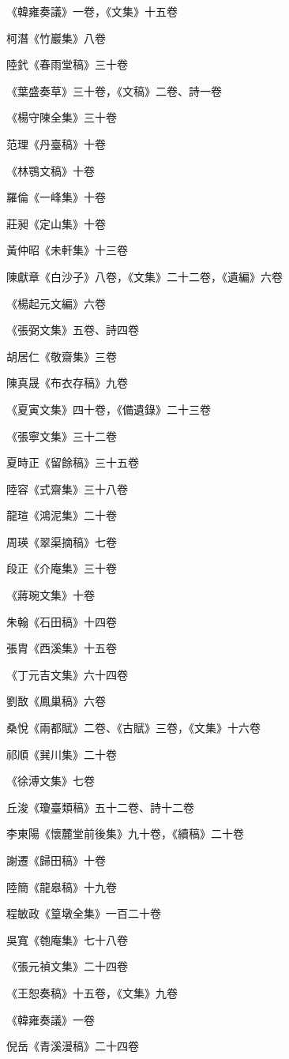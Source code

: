 《韓雍奏議》一卷，《文集》十五卷

柯潛《竹巖集》八卷

陸釴《春雨堂稿》三十卷

《葉盛奏草》三十卷，《文稿》二卷、詩一卷

《楊守陳全集》三十卷

范理《丹臺稿》十卷

《林鶚文稿》十卷

羅倫《一峰集》十卷

莊昶《定山集》十卷

黃仲昭《未軒集》十三卷

陳獻章《白沙子》八卷，《文集》二十二卷，《遺編》六卷

《楊起元文編》六卷

《張弼文集》五卷、詩四卷

胡居仁《敬齋集》三卷

陳真晟《布衣存稿》九卷

《夏寅文集》四十卷，《備遺錄》二十三卷

《張寧文集》三十二卷

夏時正《留餘稿》三十五卷

陸容《式齋集》三十八卷

龍瑄《鴻泥集》二十卷

周瑛《翠渠摘稿》七卷

段正《介庵集》三十卷

《蔣琬文集》十卷

朱翰《石田稿》十四卷

張胄《西溪集》十五卷

《丁元吉文集》六十四卷

劉敔《鳳巢稿》六卷

桑悅《兩都賦》二卷、《古賦》三卷，《文集》十六卷

祁順《巽川集》二十卷

《徐溥文集》七卷

丘浚《瓊臺類稿》五十二卷、詩十二卷

李東陽《懷麓堂前後集》九十卷，《續稿》二十卷

謝遷《歸田稿》十卷

陸簡《龍皋稿》十九卷

程敏政《篁墩全集》一百二十卷

吳寬《匏庵集》七十八卷

《張元禎文集》二十四卷

《王恕奏稿》十五卷，《文集》九卷

《韓雍奏議》一卷

倪岳《青溪漫稿》二十四卷

